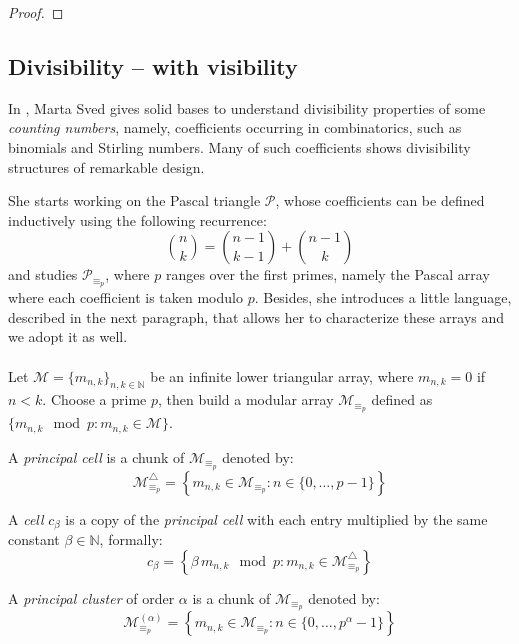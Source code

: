 \begin{proof}
\end{proof}


\subsection{Divisibility -- with visibility}

In \cite{sved:1988}, Marta Sved gives solid bases to understand
divisibility properties of some \emph{counting numbers}, namely, coefficients
occurring in combinatorics, such as binomials and Stirling numbers. Many of
such coefficients shows divisibility structures of remarkable design. 

She starts working on the Pascal triangle $\mathcal{P}$, whose coefficients
can be defined inductively using the following recurrence: 
\begin{equation}
    {{n}\choose{k}}={{n-1}\choose{k-1}}+{{n-1}\choose{k}}
    \label{eq:binomial:recurrence}
\end{equation}
and studies $\mathcal{P}_{\equiv_{p}}$, where $p$ ranges over the first primes, 
namely the Pascal array where each coefficient is taken modulo $p$. Besides, 
she introduces a little language, described in the next paragraph, that allows her to characterize these arrays 
and we adopt it as well.
\\\\
Let $\mathcal{M}=\lbrace m_{n,k}\rbrace_{n,k\in\mathbb{N}}$ 
be an infinite lower triangular array, where $m_{n,k}=0$ if 
$n<k$. Choose a prime $p$, then build a modular array
$\mathcal{M}_{\equiv_{p}}$ defined as 
$\lbrace m_{n,k}\mod p : m_{n,k} \in \mathcal{M}\rbrace$.


A \emph{principal cell} is a chunk of $\mathcal{M}_{\equiv_{p}}$ denoted by:
\begin{displaymath}
    \mathcal{M}_{\equiv_{p}}^{\bigtriangleup} = 
        \left\lbrace m_{n,k}\in \mathcal{M}_{\equiv_{p}}: n\in\lbrace 0,\ldots,p-1\rbrace\right\rbrace
\end{displaymath}

A \emph{cell} $c_{\beta}$ is a copy of the \emph{principal cell} with each entry multiplied 
by the same constant $\beta\in\mathbb{N}$, formally:
\begin{displaymath}
    c_{\beta}=\left\lbrace \beta\,m_{n,k}\mod p:m_{n,k}\in \mathcal{M}_{\equiv_{p}}^{\bigtriangleup}\right\rbrace
\end{displaymath}

A \emph{principal cluster} of order $\alpha$ is a chunk of $\mathcal{M}_{\equiv_{p}}$ denoted by:
\begin{displaymath}
    \mathcal{M}_{\equiv_{p}}^{(\alpha)} = 
        \left\lbrace m_{n,k}\in \mathcal{M}_{\equiv_{p}}: n\in\lbrace 0,\ldots,p^{\alpha}-1\rbrace\right\rbrace
\end{displaymath}

